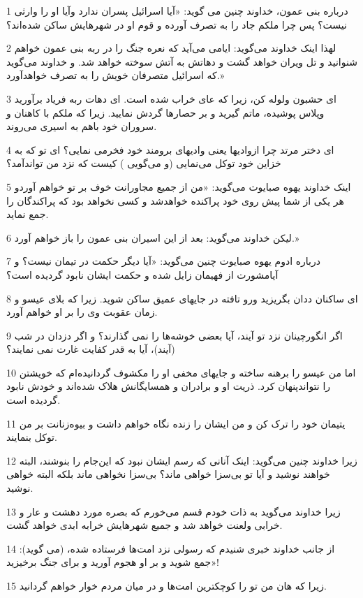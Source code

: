 \par 1 درباره بنی عمون، خداوند چنین می گوید: «آیا اسرائیل پسران ندارد وآیا او را وارثی نیست؟ پس چرا ملکم جاد را به تصرف آورده و قوم او در شهرهایش ساکن شده‌اند؟
\par 2 لهذا اینک خداوند می‌گوید: ایامی می‌آید که نعره جنگ را در ربه بنی عمون خواهم شنوانید و تل ویران خواهد گشت و دهاتش به آتش سوخته خواهد شد. و خداوند می‌گوید که اسرائیل متصرفان خویش را به تصرف خواهدآورد.»
\par 3 ‌ای حشبون ولوله کن، زیرا که عای خراب شده است. ای دهات ربه فریاد برآورید وپلاس پوشیده، ماتم گیرید و بر حصارها گردش نمایید. زیرا که ملکم با کاهنان و سروران خود باهم به اسیری می‌روند.
\par 4 ‌ای دختر مرتد چرا ازوادیها یعنی وادیهای برومند خود فخرمی نمایی؟ ای تو که به خزاین خود توکل می‌نمایی (و می‌گویی ) کیست که نزد من تواندآمد؟
\par 5 اینک خداوند یهوه صبایوت می‌گوید: «من از جمیع مجاورانت خوف بر تو خواهم آوردو هر یکی از شما پیش روی خود پراکنده خواهدشد و کسی نخواهد بود که پراکندگان را جمع نماید.
\par 6 لیکن خداوند می‌گوید: بعد از این اسیران بنی عمون را باز خواهم آورد.»
\par 7 درباره ادوم یهوه صبایوت چنین می‌گوید: «آیا دیگر حکمت در تیمان نیست؟ و آیامشورت از فهیمان زایل شده و حکمت ایشان نابود گردیده است؟
\par 8 ‌ای ساکنان ددان بگریزید ورو تافته در جایهای عمیق ساکن شوید. زیرا که بلای عیسو و زمان عقوبت وی را بر او خواهم آورد.
\par 9 اگر انگورچینان نزد تو آیند، آیا بعضی خوشه‌ها را نمی گذارند؟ و اگر دزدان در شب (آیند)، آیا به قدر کفایت غارت نمی نمایند؟
\par 10 اما من عیسو را برهنه ساخته و جایهای مخفی او را مکشوف گردانیده‌ام که خویشتن را نتواندپنهان کرد. ذریت او و برادران و همسایگانش هلاک شده‌اند و خودش نابود گردیده است.
\par 11 یتیمان خود را ترک کن و من ایشان را زنده نگاه خواهم داشت و بیوه‌زنانت بر من توکل بنمایند.
\par 12 زیرا خداوند چنین می‌گوید: اینک آنانی که رسم ایشان نبود که این‌جام را بنوشند، البته خواهند نوشید و آیا تو بی‌سزا خواهی ماند؟ بی‌سزا نخواهی ماند بلکه البته خواهی نوشید.
\par 13 زیرا خداوند می‌گوید به ذات خودم قسم می‌خورم که بصره مورد دهشت و عار و خرابی ولعنت خواهد شد و جمیع شهرهایش خرابه ابدی خواهد گشت.
\par 14 از جانب خداوند خبری شنیدم که رسولی نزد امت‌ها فرستاده شده، (می گوید): «جمع شوید و بر او هجوم آورید و برای جنگ برخیزید!
\par 15 زیرا که هان من تو را کوچکترین امت‌ها و در میان مردم خوار خواهم گردانید.
